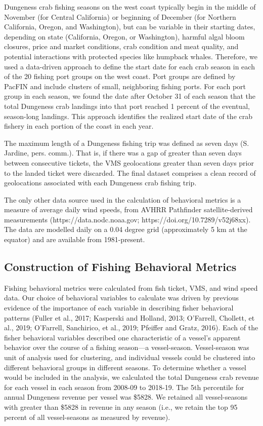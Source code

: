 \documentclass[]{elsarticle} %
\begin{document}
Dungeness crab fishing seasons on the west coast typically begin in the
middle of November (for Central California) or beginning of December
(for Northern California, Oregon, and Washington), but can be variable
in their starting dates, depending on state (California, Oregon, or
Washington), harmful algal bloom closures, price and market conditions,
crab condition and meat quality, and potential interactions with
protected species like humpback whales. Therefore, we used a data-driven
approach to define the start date for each crab season in each of the 20
fishing port groups on the west coast. Port groups are defined by PacFIN
and include clusters of small, neighboring fishing ports. For each port
group in each season, we found the date after October 31 of each season
that the total Dungeness crab landings into that port reached 1 percent
of the eventual, season-long landings. This approach identifies the
realized start date of the crab fishery in each portion of the coast in
each year.

The maximum length of a Dungeness fishing trip was defined as seven days
(S. Jardine, pers. comm.). That is, if there was a gap of greater than
seven days between consecutive tickets, the VMS geolocations greater
than seven days prior to the landed ticket were discarded. The final
dataset comprises a clean record of geolocations associated with each
Dungeness crab fishing trip.

The only other data source used in the calculation of behavioral metrics
is a measure of average daily wind speeds, from AVHRR Pathfinder
satellite-derived measurements (https://data.nodc.noaa.gov;
https://doi.org/10.7289/v52j68xx). The data are modelled daily on a 0.04
degree grid (approximately 5 km at the equator) and are available from
1981-present.

\hypertarget{construction-of-fishing-behavioral-metrics}{%
\subsection{Construction of Fishing Behavioral
Metrics}\label{construction-of-fishing-behavioral-metrics}}

Fishing behavioral metrics were calculated from fish ticket, VMS, and
wind speed data. Our choice of behavioral variables to calculate was
driven by previous evidence of the importance of each variable in
describing fisher behavioral patterns (Fuller et al., 2017; Kasperski
and Holland, 2013; O'Farrell, Chollett, et al., 2019; O'Farrell,
Sanchirico, et al., 2019; Pfeiffer and Gratz, 2016). Each of the fisher
behavioral variables described one characteristic of a vessel's apparent
behavior over the course of a fishing season---a vessel-season.
Vessel-season was unit of analysis used for clustering, and individual
vessels could be clustered into different behavioral groups in different
seasons. To determine whether a vessel would be included in the
analysis, we calculated the total Dungeness crab revenue for each vessel
in each season from 2008-09 to 2018-19. The 5th percentile for annual
Dungeness revenue per vessel was \$5828. We retained all vessel-seasons
with greater than \$5828 in revenue in any season (i.e., we retain the
top 95 percent of all vessel-seasons as measured by revenue).
\end{document}
